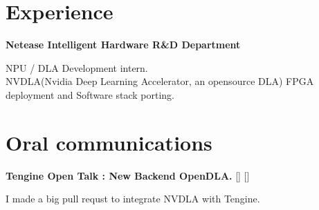 \documentclass[a4paper,10pt]{article}
\begin{document}
\begin{adjustbox}{valign=t}
\begin{minipage}{0.6\textwidth}
\section*{Experience}
\begin{description}
\raggedright
\item[\normalfont \textcolor{ColorOne}{Sep. 2021 - Oct. 2021.}] 
	\textbf{Netease Intelligent Hardware R\&D Department}\\ \medskip
	
	NPU / DLA Development intern.\\
	
	NVDLA(Nvidia Deep Learning Accelerator, an opensource DLA) FPGA deployment and Software stack porting.
	
\end{description}

\section*{Oral communications}
\begin{description}
	\raggedright
	\item [\normalfont \textcolor{ColorOne}{Sep. 23th, 2021.}] 
	\textbf{Tengine Open Talk : New Backend OpenDLA.} [] []

	I made a big pull requst  to integrate NVDLA with Tengine.
\end{description}


\MySkip

\LastUpdate
\end{minipage}
\end{adjustbox}
\end{document}
